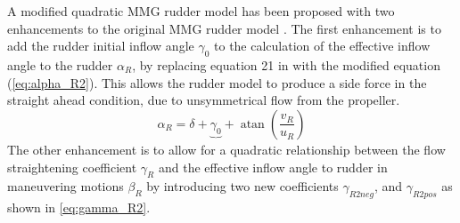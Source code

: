 A modified quadratic MMG rudder model has been proposed with two enhancements to the original MMG rudder model \citep{yasukawaIntroductionMMGStandard2015}. The first enhancement is to add the rudder initial inflow angle $\gamma_0$ to the calculation of the effective inflow angle to the rudder $\alpha_R$, by replacing equation 21 in \citet{yasukawaIntroductionMMGStandard2015} with the modified equation (\autoref{eq:alpha_R2}). This allows the rudder model to produce a side force in the straight ahead condition, due to unsymmetrical flow from the propeller. 
\begin{equation}
    \label{eq:alpha_R2}
    \alpha_{R} = \delta + \underbrace{\gamma_{0}}_{~} + \operatorname{atan}{\left(\frac{v_{R}}{u_{R}} \right)}
\end{equation}
The other enhancement is to allow for a quadratic relationship between the flow straightening coefficient $\gamma_R$ and the effective inflow angle to rudder in maneuvering motions $\beta_R$ by introducing two new coefficients $\gamma_{R2neg}$, and $\gamma_{R2pos}$ as shown in \autoref{eq:gamma_R2}.
\begin{equation}
    \label{eq:gamma_R2}
    
\end{equation}

